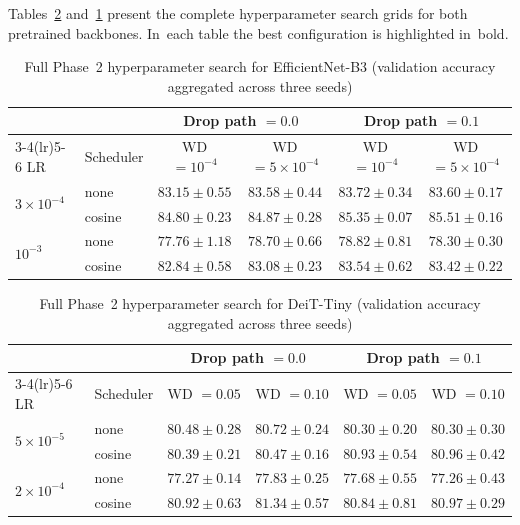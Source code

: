 \documentclass[12pt,a4paper]{article}
\begin{document}
Tables~\ref{tab:phase2-deit-full} and~\ref{tab:phase2-effnet-full} present the complete hyperparameter search grids for both pretrained backbones. In~each table the best configuration is highlighted in~bold.

\begin{table}[t!]
\centering
\caption{Full Phase~2 hyperparameter search for EfficientNet-B3
         (validation accuracy aggregated across three seeds)}
\label{tab:phase2-effnet-full}
\smallskip
\footnotesize
\begin{tabular}{@{}llcccc@{}}
\toprule
& & \multicolumn{2}{c}{Drop path $= 0.0$}
  & \multicolumn{2}{c}{Drop path $= 0.1$} \\
\cmidrule(lr){3-4}\cmidrule(lr){5-6}
LR & Scheduler
  & WD $= 10^{-4}$ & WD $= 5{\times}10^{-4}$
  & WD $= 10^{-4}$ & WD $= 5{\times}10^{-4}$ \\
\midrule
\multirow{2}{*}{$3 \times 10^{-4}$}
  & none   & $83.15{\pm}0.55$ & $83.58{\pm}0.44$
           & $83.72{\pm}0.34$ & $83.60{\pm}0.17$ \\
  & cosine & $84.80{\pm}0.23$ & $84.87{\pm}0.28$
           & $85.35{\pm}0.07$ & $\mathbf{85.51{\pm}0.16}$ \\
\midrule
\multirow{2}{*}{$10^{-3}$}
  & none   & $77.76{\pm}1.18$ & $78.70{\pm}0.66$
           & $78.82{\pm}0.81$ & $78.30{\pm}0.30$ \\
  & cosine & $82.84{\pm}0.58$ & $83.08{\pm}0.23$
           & $83.54{\pm}0.62$ & $83.42{\pm}0.22$ \\
\bottomrule
\end{tabular}

\end{table}

\begin{table}[t!]
\centering
\caption{Full Phase~2 hyperparameter search for DeiT-Tiny
         (validation accuracy aggregated across three seeds)}
\label{tab:phase2-deit-full}
\smallskip
\footnotesize
\begin{tabular}{@{}llcccc@{}}
\toprule
& & \multicolumn{2}{c}{Drop path $= 0.0$}
  & \multicolumn{2}{c}{Drop path $= 0.1$} \\
\cmidrule(lr){3-4}\cmidrule(lr){5-6}
LR & Scheduler
  & WD $= 0.05$ & WD $= 0.10$
  & WD $= 0.05$ & WD $= 0.10$ \\
\midrule
\multirow{2}{*}{$5 \times 10^{-5}$}
  & none   & $80.48{\pm}0.28$ & $80.72{\pm}0.24$
           & $80.30{\pm}0.20$ & $80.30{\pm}0.30$ \\
  & cosine & $80.39{\pm}0.21$ & $80.47{\pm}0.16$
           & $80.93{\pm}0.54$ & $80.96{\pm}0.42$ \\
\midrule
\multirow{2}{*}{$2 \times 10^{-4}$}
  & none   & $77.27{\pm}0.14$ & $77.83{\pm}0.25$
           & $77.68{\pm}0.55$ & $77.26{\pm}0.43$ \\
  & cosine & $80.92{\pm}0.63$ & $\mathbf{81.34{\pm}0.57}$
           & $80.84{\pm}0.81$ & $80.97{\pm}0.29$ \\
\bottomrule
\end{tabular}

\end{table}
\end{document}
